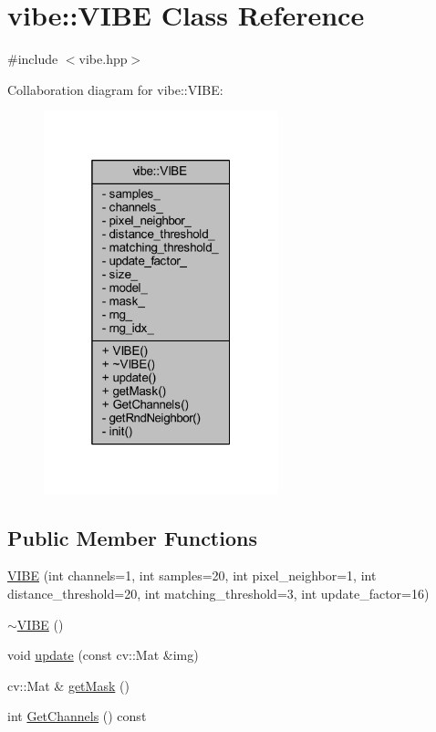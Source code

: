 \hypertarget{classvibe_1_1_v_i_b_e}{}\section{vibe\+:\+:V\+I\+BE Class Reference}
\label{classvibe_1_1_v_i_b_e}


{\ttfamily \#include $<$vibe.\+hpp$>$}



Collaboration diagram for vibe\+:\+:V\+I\+BE\+:\nopagebreak
\begin{figure}[H]
\begin{center}
\leavevmode
\includegraphics[width=193pt]{classvibe_1_1_v_i_b_e__coll__graph}
\end{center}
\end{figure}
\subsection*{Public Member Functions}
\begin{DoxyCompactItemize}
\item 
\mbox{\hyperlink{classvibe_1_1_v_i_b_e_a57bebe0c56531dbd274e9d8e2a07fca5}{V\+I\+BE}} (int channels=1, int samples=20, int pixel\+\_\+neighbor=1, int distance\+\_\+threshold=20, int matching\+\_\+threshold=3, int update\+\_\+factor=16)
\item 
\mbox{\hyperlink{classvibe_1_1_v_i_b_e_ac74c9e86dff359028892e86ec699a17c}{$\sim$\+V\+I\+BE}} ()
\item 
void \mbox{\hyperlink{classvibe_1_1_v_i_b_e_a9730e3695fa085ae907767390b3ad3de}{update}} (const cv\+::\+Mat \&img)
\item 
cv\+::\+Mat \& \mbox{\hyperlink{classvibe_1_1_v_i_b_e_a8d8f40e61ee0bca8d7ab3fc4912a23dc}{get\+Mask}} ()
\item 
int \mbox{\hyperlink{classvibe_1_1_v_i_b_e_a8d325dc6deb7fc6e53e2c5074611c434}{Get\+Channels}} () const
\end{DoxyCompactItemize}
